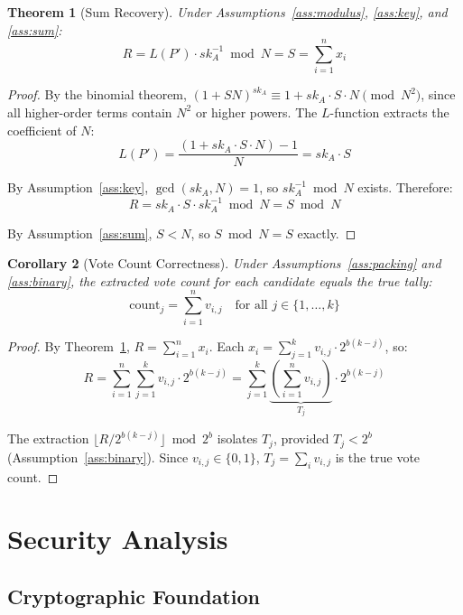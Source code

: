 \documentclass[11pt, a4paper]{article}
\newtheorem{theorem}{Theorem}[section]
\newtheorem{corollary}[theorem]{Corollary}
\begin{document}
\begin{theorem}[Sum Recovery]\label{thm:sum}
Under Assumptions~\ref{ass:modulus}, \ref{ass:key}, and \ref{ass:sum}:
$$R = L(P') \cdot sk_A^{-1} \bmod N = S = \sum_{i=1}^n x_i$$
\end{theorem}

\begin{proof}
By the binomial theorem, $(1 + SN)^{sk_A} \equiv 1 + sk_A \cdot S \cdot N \pmod{N^2}$, since all higher-order terms contain $N^2$ or higher powers. The $L$-function extracts the coefficient of $N$:
$$L(P') = \frac{(1 + sk_A \cdot S \cdot N) - 1}{N} = sk_A \cdot S$$

By Assumption~\ref{ass:key}, $\gcd(sk_A, N) = 1$, so $sk_A^{-1} \bmod N$ exists. Therefore:
$$R = sk_A \cdot S \cdot sk_A^{-1} \bmod N = S \bmod N$$

By Assumption~\ref{ass:sum}, $S < N$, so $S \bmod N = S$ exactly.
\end{proof}

\begin{corollary}[Vote Count Correctness]\label{cor:votes}
Under Assumptions~\ref{ass:packing} and \ref{ass:binary}, the extracted vote count for each candidate equals the true tally:
$$\text{count}_j = \sum_{i=1}^{n} v_{i,j} \quad \text{for all } j \in \{1, \ldots, k\}$$
\end{corollary}

\begin{proof}
By Theorem~\ref{thm:sum}, $R = \sum_{i=1}^n x_i$. Each $x_i = \sum_{j=1}^k v_{i,j} \cdot 2^{b(k-j)}$, so:
$$R = \sum_{i=1}^n \sum_{j=1}^k v_{i,j} \cdot 2^{b(k-j)} = \sum_{j=1}^k \underbrace{\left(\sum_{i=1}^n v_{i,j}\right)}_{T_j} \cdot 2^{b(k-j)}$$

The extraction $\lfloor R / 2^{b(k-j)} \rfloor \bmod 2^b$ isolates $T_j$, provided $T_j < 2^b$ (Assumption~\ref{ass:binary}). Since $v_{i,j} \in \{0,1\}$, $T_j = \sum_i v_{i,j}$ is the true vote count.
\end{proof}

\section{Security Analysis}\label{sec:security}

\subsection{Cryptographic Foundation}
\end{document}

